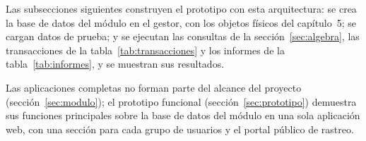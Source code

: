 
Las subsecciones siguientes construyen el prototipo con esta
arquitectura: se crea la base de datos del módulo en el gestor, con los
objetos físicos del capítulo~5; se cargan datos de prueba; y se ejecutan
las consultas de la sección~\ref{sec:algebra}, las transacciones de la
tabla~\ref{tab:transacciones} y los informes de la
tabla~\ref{tab:informes}, y se muestran sus resultados.



Las aplicaciones completas no forman parte del alcance del proyecto
(sección~\ref{sec:modulo}); el prototipo funcional
(sección~\ref{sec:prototipo}) demuestra sus funciones principales sobre
la base de datos del módulo en una sola aplicación web, con una sección
para cada grupo de usuarios y el portal público de rastreo.
